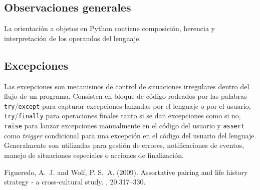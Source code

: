 \documentclass[12pt]{article} %
\begin{document}
\subsection{Observaciones generales}
La orientación a objetos en Python contiene composición, herencia y interpretación de los operandos del lenguaje.
\subsection{Excepciones}
Las excepciones son mecanismos de control de situaciones irregulares dentro del flujo de un programa. Consisten en bloque de código rodeados por las palabras \verb+try+/\verb+except+ para capturar excepciones lanzadas por el lenguaje o por el usuario, \verb+try+/\verb+finally+ para operaciones finales tanto si se dan excepciones como si no, \verb+raise+ para lanzar excepciones manualmente en el código del usuario y \verb+assert+ como \textit{trigger} condicional para una excepción en el código del usuario del lenguaje. Generalmente son utilizadas para gestión de errores, notificaciones de eventos, manejo de situaciones especiales o acciones de finalización.


\begin{thebibliography}{99} %

Figueredo, A.~J. and Wolf, P. S.~A. (2009).
\newblock Assortative pairing and life history strategy - a cross-cultural
  study.
, 20:317--330.
 
\end{thebibliography}

\end{document}
